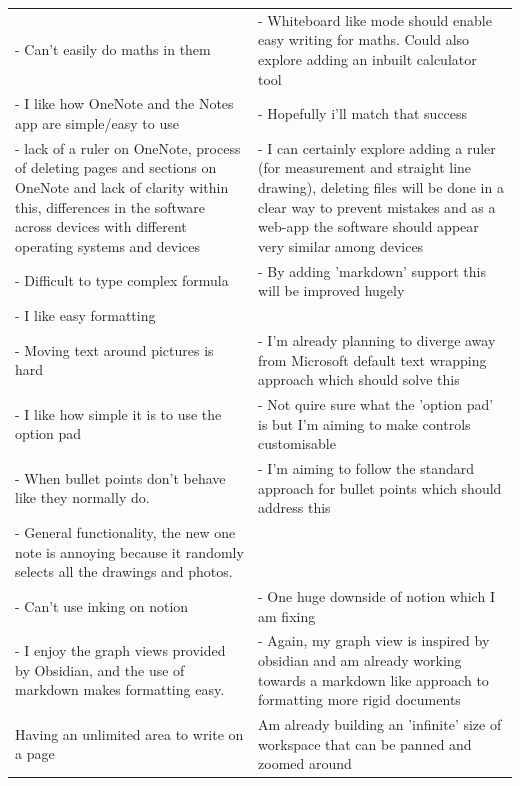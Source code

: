 \begin{longtable}{@{}p{}@{\hspace{1em}}p{}@{}}
- Can't easily do maths in them & 
- Whiteboard like mode should enable easy writing for maths. Could also explore adding an inbuilt calculator tool\\ 

- I like how OneNote and the Notes app are simple/easy to use &
- Hopefully i'll match that success \\ 

- lack of a ruler on OneNote, process of deleting pages and sections on OneNote and lack of clarity within this, differences in the software across devices with different operating systems and devices & 
- I can certainly explore adding a ruler (for measurement and straight line drawing), deleting files will be done in a clear way to prevent mistakes and as a web-app the software should appear very similar among devices \\ 

- Difficult to type complex formula & 
- By adding 'markdown' support this will be improved hugely \\ 

- I like easy formatting  & \\ 


- Moving text around pictures is hard & 
- I'm already planning to diverge away from Microsoft default text wrapping approach which should solve this \\ 

- I like how simple it is to use the option pad & 
- Not quire sure what the 'option pad' is but I'm aiming to make controls customisable \\

- When bullet points don't behave like they normally do. & 
- I'm aiming to follow the standard approach for bullet points which should address this \\ 

- General functionality, the new one note is annoying because it randomly selects all the drawings and photos. & \\

- Can't use inking on notion & 
- One huge downside of notion which I am fixing  \\

- I enjoy the graph views provided by Obsidian, and the use of markdown makes formatting easy. & 
- Again, my graph view is inspired by obsidian and am already working towards a markdown like approach to formatting more rigid documents \\
 
Having an unlimited area to write on a page & 
Am already building an 'infinite' size of workspace that can be panned and zoomed around\\


\end{longtable}
